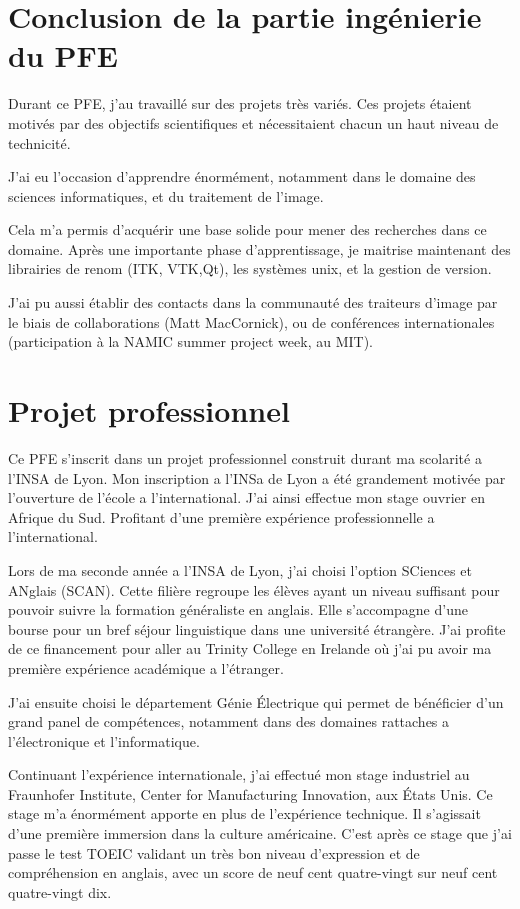 \section{Conclusion de la partie ingénierie du PFE}

Durant ce PFE, j'au travaillé sur des projets très variés.
Ces projets étaient motivés par des objectifs scientifiques et nécessitaient chacun un haut niveau de technicité.

J'ai eu l'occasion d'apprendre énormément,
notamment dans le domaine des sciences informatiques,
et du traitement de l'image.

Cela m'a permis d'acquérir une base solide pour mener des recherches dans ce domaine.
Après une importante phase d'apprentissage, je maitrise maintenant des librairies de renom
(ITK, VTK,Qt), les systèmes unix, et la gestion de version.

J'ai pu aussi établir des contacts dans la communauté des traiteurs d'image par le biais de collaborations
(Matt MacCornick), ou de conférences internationales (participation à la NAMIC summer project week, au MIT). 

\section{Projet professionnel}

Ce PFE s'inscrit dans un projet professionnel construit durant ma scolarité a l'INSA de Lyon.
Mon inscription a l'INSa de Lyon a été grandement motivée par l'ouverture de l'école a l'international. J'ai ainsi effectue mon stage ouvrier en Afrique du Sud. Profitant d'une première expérience professionnelle a l'international.

Lors de ma seconde année a l'INSA de Lyon, j'ai choisi l'option SCiences et ANglais (SCAN).
Cette filière regroupe les élèves ayant un niveau suffisant pour pouvoir suivre la formation généraliste en anglais.
Elle s'accompagne d'une bourse pour un bref séjour linguistique dans une université étrangère.
J'ai profite de ce financement pour aller au Trinity College en Irelande où
j'ai pu avoir ma première expérience académique a l'étranger.

J'ai ensuite choisi le département Génie Électrique qui permet de bénéficier d'un grand panel de compétences,
notamment dans des domaines rattaches a l'électronique et l'informatique.

Continuant l'expérience internationale, j'ai effectué mon stage industriel au
Fraunhofer Institute, Center for Manufacturing Innovation, aux États Unis.
Ce stage m'a énormément apporte en plus de l'expérience technique.
Il s'agissait d'une première immersion dans la culture américaine.
C'est après ce stage que j'ai passe le test TOEIC validant un très bon niveau d'expression et de compréhension en anglais,
avec un score de neuf cent quatre-vingt sur neuf cent quatre-vingt dix.

